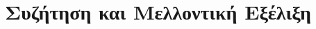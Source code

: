 \chapter{\label{summary}Συζήτηση και Μελλοντική Εξέλιξη}

\setcounter{equation}{0}
\setcounter{table}{0}
\setcounter{figure}{0}
